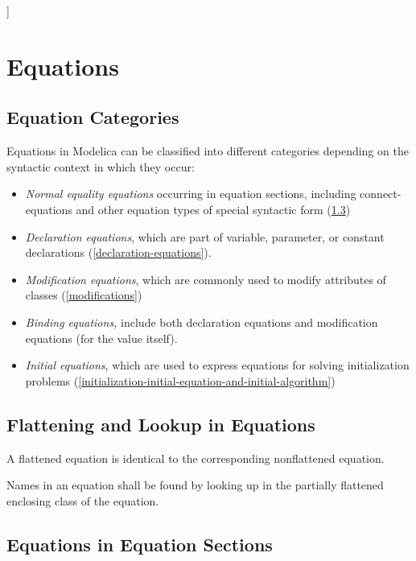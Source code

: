 \documentclass[10pt,a4paper]{report}
\def\doublelabel#1{\label{#1}}
\begin{document}
{]}

\chapter{Equations}\doublelabel{equations}

\section{Equation Categories}\doublelabel{equation-categories}

Equations in Modelica can be classified into different categories
depending on the syntactic context in which they occur:

\begin{itemize}
\item
  \emph{Normal equality equations} occurring in equation sections,
  including connect-equations and other equation types of special
  syntactic form (\ref{equations-in-equation-sections})
\item
  \emph{Declaration equations}, which are part of variable, parameter,
  or constant declarations (\ref{declaration-equations}).
\item
  \emph{Modification equations}, which are commonly used to modify
  attributes of classes (\ref{modifications})
\item
  \emph{Binding equations,} include both declaration equations and
  modification equations (for the value itself).
\item
  \emph{Initial equations}, which are used to express equations for
  solving initialization problems (\ref{initialization-initial-equation-and-initial-algorithm})
\end{itemize}

\section{Flattening and Lookup in Equations}\doublelabel{flattening-and-lookup-in-equations}

A flattened equation is identical to the corresponding nonflattened
equation.

Names in an equation shall be found by looking up in the partially
flattened enclosing class of the equation.

\section{Equations in Equation Sections}\doublelabel{equations-in-equation-sections}
\end{document}
